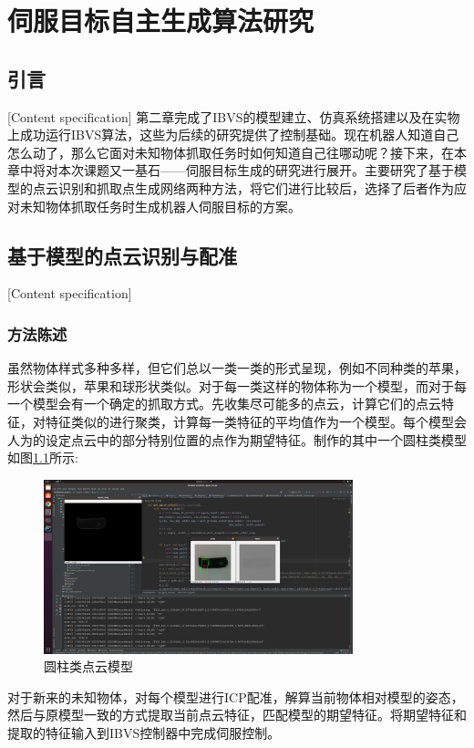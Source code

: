 \documentclass[fontset=fandol,type=bachelor,campus=harbin]{hithesisbook}
\begin{document}
\chapter[伺服目标生成算法研究]{伺服目标自主生成算法研究}
\section{引言}[Content specification]
第二章完成了IBVS的模型建立、仿真系统搭建以及在实物上成功运行IBVS算法，这些为后续的研究提供了控制基础。现在机器人知道自己怎么动了，那么它面对未知物体抓取任务时如何知道自己往哪动呢？接下来，在本章中将对本次课题又一基石——伺服目标生成的研究进行展开。主要研究了基于模型的点云识别和抓取点生成网络两种方法，将它们进行比较后，选择了后者作为应对未知物体抓取任务时生成机器人伺服目标的方案。


\section{基于模型的点云识别与配准}[Content specification]
\subsection{方法陈述}
虽然物体样式多种多样，但它们总以一类一类的形式呈现，例如不同种类的苹果，形状会类似，苹果和球形状类似。对于每一类这样的物体称为一个模型，而对于每一个模型会有一个确定的抓取方式。先收集尽可能多的点云，计算它们的点云特征，对特征类似的进行聚类，计算每一类特征的平均值作为一个模型。每个模型会人为的设定点云中的部分特别位置的点作为期望特征。制作的其中一个圆柱类模型如图\ref{圆柱类点云模型}所示:
\begin{figure}[h]
\centering
\includegraphics[width = 0.8\textwidth]{chapter3/实时抓取点生成}
\caption{圆柱类点云模型}
\label{圆柱类点云模型}
\end{figure}


对于新来的未知物体，对每个模型进行ICP配准，解算当前物体相对模型的姿态，然后与原模型一致的方式提取当前点云特征，匹配模型的期望特征。将期望特征和提取的特征输入到IBVS控制器中完成伺服控制。
\end{document}

